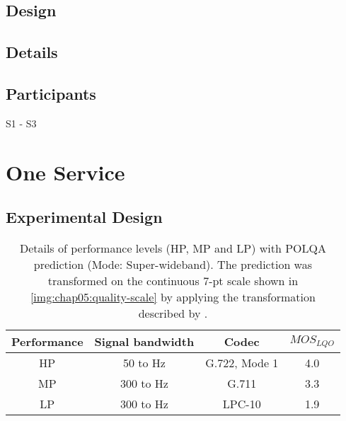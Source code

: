 \subsection{Design}

\subsection{Details}

\subsection{Participants}
S1 - S3


\section{One Service}


\subsection{Experimental Design}

\begin{table}
 \centering
 \begin{tabulary}{\columnwidth}{C|C|C|C}
   Performance & Signal bandwidth & Codec & $MOS_{LQO}$ \\
   \midrule
   HP & 50 to \unit[7000]{Hz}  & G.722, Mode 1 & 4.0 \\ %
   \hline
   MP & 300 to \unit[3400]{Hz} & G.711         & 3.3 \\ %
   \hline
   LP & 300 to \unit[3400]{Hz} & LPC-10        & 1.9 \\ %
   \end{tabulary}
   \caption{Details of performance levels (\ac{HP}, \ac{MP} and \ac{LP}) with \ac{POLQA} prediction (Mode: Super-wideband). The prediction was transformed on the continuous 7-pt scale shown in \autoref{img:chap05:quality-scale} by applying the transformation described by  \cite{koster_comparison_2015}.}
   \label{tab:performance}
\end{table}

